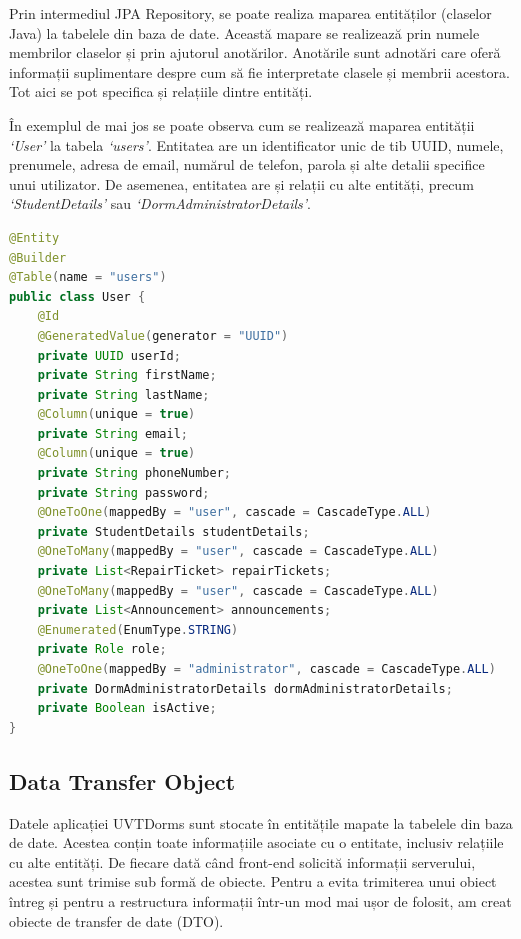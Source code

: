 \documentclass[12pt,a4paper]{report}
\theoremstyle{definition}
\theoremstyle{remark}
\begin{document}
\par Prin intermediul JPA Repository, se poate realiza maparea entităților (claselor Java) la tabelele din baza de date. Această mapare se realizează prin numele membrilor claselor și prin ajutorul anotărilor. Anotările sunt adnotări care oferă informații suplimentare despre cum să fie interpretate clasele și membrii acestora. Tot aici se pot specifica și relațiile dintre entități.

\par În exemplul de mai jos se poate observa cum se realizează maparea entității \textit{`User'} la tabela \textit{`users'}. Entitatea are un identificator unic de tib UUID, numele, prenumele, adresa de email, numărul de telefon, parola și alte detalii specifice unui utilizator. De asemenea, entitatea are și relații cu alte entități, precum \textit{`StudentDetails'} sau \textit{`DormAdministratorDetails'}.

\begin{lstlisting}[language=Java, caption={Clasa User}]
@Entity
@Builder
@Table(name = "users")
public class User {
    @Id
    @GeneratedValue(generator = "UUID")
    private UUID userId;
    private String firstName;
    private String lastName;
    @Column(unique = true)
    private String email;
    @Column(unique = true)
    private String phoneNumber;
    private String password;
    @OneToOne(mappedBy = "user", cascade = CascadeType.ALL)
    private StudentDetails studentDetails;
    @OneToMany(mappedBy = "user", cascade = CascadeType.ALL)
    private List<RepairTicket> repairTickets;
    @OneToMany(mappedBy = "user", cascade = CascadeType.ALL)
    private List<Announcement> announcements;
    @Enumerated(EnumType.STRING)
    private Role role;
    @OneToOne(mappedBy = "administrator", cascade = CascadeType.ALL)
    private DormAdministratorDetails dormAdministratorDetails;
    private Boolean isActive;
}
\end{lstlisting}

\subsection{Data Transfer Object}

\par Datele aplicației UVTDorms sunt stocate în entitățile mapate la tabelele din baza de date. Acestea conțin toate informațiile asociate cu o entitate, inclusiv relațiile cu alte entități. De fiecare dată când front-end solicită informații serverului, acestea sunt trimise sub formă de obiecte. Pentru a evita trimiterea unui obiect întreg și pentru a restructura informații într-un mod mai ușor de folosit, am creat obiecte de transfer de date (DTO)\cite{pantaleev2007identifying}.
\end{document}
